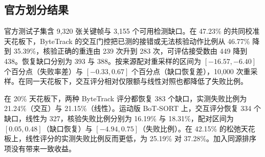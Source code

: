 \subsection{官方划分结果}
官方测试子集含 9,320 张关键帧与 3,155 个可用检测缺口。在 47.23\% 的共同校准天花板下，ByteTrack 的交互门控把已测的接错或无法核验动作比例从 46.77\% 降到 35.39\%，核验正确的重连由 239 次升到 283 次，可评估接受数由 449 降到 438。恢复缺口分别为 393 与 388。按来源配对重采样的区间为 $[-16.57,-6.40]$ 个百分点（失败率差）与 $[-0.33,0.67]$ 个百分点（缺口恢复差），10,000 次重采样。在同一天花板下，交互评分相对仅限额与线性对照也都降低了失败比例。

在 20\% 天花板下，两种 ByteTrack 评分都恢复 383 个缺口，实测失败比例为 21.24\%（交互）与 21.15\%（线性）。运动版 BoT-SORT 上，交互评分恢复 334 个缺口，线性为 327，核验失败比例分别为 16.19\% 与 18.31\%，配对区间为 $[0.05,0.48]$（缺口恢复）与 $[-4.94,0.75]$（失败比例）。在 42.15\% 的松弛天花板上，线性评分的实测失败比例反而更低，为 25.19\% 对 37.28\%。加入同源排序项没有带来一致收益。



